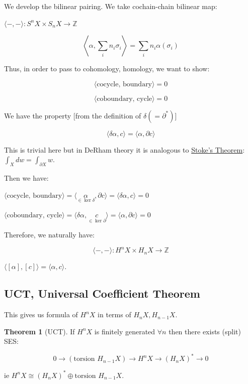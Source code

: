 \documentclass{article}
\theoremstyle{definition}
\newtheorem{theorem}{Theorem}
\begin{document}
    We develop the bilinear pairing. We take cochain-chain bilinear map:

    \(\langle -,- \rangle : S^n X \times S_n X \to \mathbb{Z}\) 

    \[
        \left\langle \alpha , \sum_{i} n_i \sigma_i \right\rangle = \sum_{i} n_i \alpha(\sigma_i)
    \]

    Thus, in order to pass to cohomology, homology, we want to show:

    \[
        \langle \text{cocycle, boundary} \rangle = 0
    \]

    \[
        \langle \text{coboundary, cycle} \rangle = 0
    \]

    We have the property [from the definition of \(\delta (=\partial^{\ast})\)]

    \[
        \langle \delta \alpha , c \rangle = \langle \alpha , \partial c \rangle
    \]

    This is trivial here but in DeRham theory it is analogous to \underline{Stoke's Theorem}: \(\int_X dw = \int_{\partial X}w\).
    
    Then we have:

    \(\langle \text{cocycle, boundary} \rangle = \langle \underset{\in \ker \delta}{\alpha}, \partial c \rangle = \langle \delta \alpha , c \rangle = 0\)

    \(\langle \text{coboundary, cycle} \rangle = \langle \delta \alpha , \underset{\in \operatorname{ker} \partial}{c} \rangle = \langle \alpha, \partial c \rangle = 0 \) 

    Therefore, we naturally have:

    \[
        \langle -,- \rangle : H^n X \times H_n X \to \mathbb{Z}
    \]

    \(\langle [\alpha], [c] \rangle = \langle \alpha , c \rangle\).
    
    \subsection*{UCT, Universal Coefficient Theorem}

    This gives us formula of \(H^n X\) in terms of \(H_n X, H_{n-1} X\).

    \begin{theorem}
        [UCT] If \(H^n X\) is finitely generated \(\forall n\) then there exists (split) SES:

        \[
            0 \to (\text{torsion } H_{n-1} X) \to H^n X \to (H_n X)^{\ast} \to 0
        \]

        ie \(H^n X \cong (H_n X)^{\ast} \oplus \text{torsion } H_{n-1} X\).
    \end{theorem}
\end{document}
